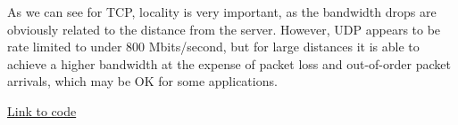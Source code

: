 \documentclass[paper=a4, fontsize=11pt]{scrartcl}
\numberwithin{equation}{section}    %
\numberwithin{figure}{section}      %
\numberwithin{table}{section}       %
\begin{document}
As we can see for TCP, locality is very important, as the bandwidth drops are obviously related to the distance from the server.
However, UDP appears to be rate limited to under 800 Mbits/second, but for large distances it is able to achieve a higher bandwidth at the expense of packet loss and out-of-order packet arrivals, which may be OK for some applications.

\href{https://github.com/valenting/id2210-cloud-project-2018/blob/master/test_network.py}{Link to code}

\end{document}
